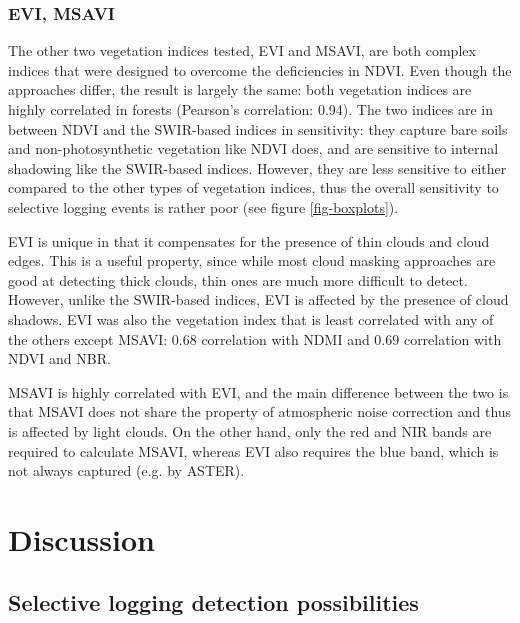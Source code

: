 \documentclass[a4paper,12pt]{scrbook}
\begin{document}
\subsection{EVI, MSAVI}

The other two vegetation indices tested, \ac{EVI} and \ac{MSAVI}, are both complex indices that were designed to overcome the deficiencies in \ac{NDVI}. Even though the approaches differ, the result is largely the same: both vegetation indices are highly correlated in forests (Pearson's correlation: 0.94). The two indices are in between \ac{NDVI} and the \ac{SWIR}-based indices in sensitivity: they capture bare soils and non-photosynthetic vegetation like \ac{NDVI} does, and are sensitive to internal shadowing like the \ac{SWIR}-based indices. However, they are less sensitive to either compared to the other types of vegetation indices, thus the overall sensitivity to selective logging events is rather poor (see figure \ref{fig-boxplots}).

\ac{EVI} is unique in that it compensates for the presence of thin clouds and cloud edges. This is a useful property, since while most cloud masking approaches are good at detecting thick clouds, thin ones are much more difficult to detect. However, unlike the \ac{SWIR}-based indices, \ac{EVI} is affected by the presence of cloud shadows. \ac{EVI} was also the vegetation index that is least correlated with any of the others except \ac{MSAVI}: 0.68 correlation with \ac{NDMI} and 0.69 correlation with \ac{NDVI} and \ac{NBR}.

\ac{MSAVI} is highly correlated with \ac{EVI}, and the main difference between the two is that \ac{MSAVI} does not share the property of atmospheric noise correction and thus is affected by light clouds. On the other hand, only the red and \ac{NIR} bands are required to calculate \ac{MSAVI}, whereas \ac{EVI} also requires the blue band, which is not always captured (e.g. by \ac{ASTER}).

\chapter{Discussion}

\section{Selective logging detection possibilities}

\end{document}
